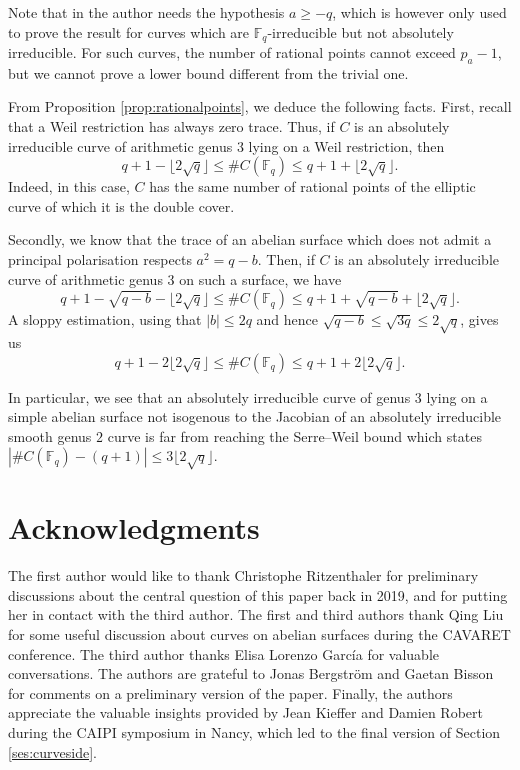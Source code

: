 \documentclass[11pt]{amsart}
\newcommand\Fq{\mathbb{F}_q}
\theoremstyle{plain}
\theoremstyle{definition}
\begin{document}
Note that in \cite[Thm.~4]{Haloui17} the author needs the hypothesis $a\geq -q$, which is however only used  to prove the result for curves which are $\Fq$-irreducible but not absolutely irreducible. For such curves, the number of rational points cannot exceed $p_a-1$, but we cannot prove a lower bound different from the trivial one.

From Proposition \ref{prop:rationalpoints}, we deduce the following facts. First, recall that a Weil restriction has always zero trace. Thus, if $C$ is an absolutely irreducible curve of arithmetic genus $3$ lying on a Weil restriction, then
\begin{equation}\label{eq:bound_weilrestr}
    q + 1 - \lfloor 2\sqrt{q}\rfloor\leq\#C(\Fq)\leq  q + 1 + \lfloor 2\sqrt{q}\rfloor.
\end{equation}
Indeed, in this case, $C$ has the same number of rational points of the elliptic curve of which it is the double cover.

Secondly, we know that the trace of an abelian surface which does not admit a principal polarisation respects $a^2=q-b$. Then, if $C$ is an absolutely irreducible curve of arithmetic genus $3$ on such a surface, we have
\[q + 1 -\sqrt{q-b}- \lfloor 2\sqrt{q}\rfloor\leq\#C(\Fq)\leq  q + 1 +\sqrt{q-b} +\lfloor 2\sqrt{q}\rfloor.\]
A sloppy estimation, using that $|b|\leq 2q$ and hence $\sqrt{q-b}\leq \sqrt{3q}\leq 2 \sqrt{q}$, gives us
\begin{equation}\label{eq:bound_nopp}
    q + 1 - 2\lfloor 2\sqrt{q}\rfloor\leq\#C(\Fq)\leq  q + 1 + 2\lfloor 2\sqrt{q}\rfloor.
\end{equation}

In particular, we see that an absolutely irreducible curve of genus $3$ lying on a simple abelian surface not isogenous to the Jacobian of an absolutely irreducible smooth genus $2$ curve is far from reaching the Serre--Weil bound which states $|\#C(\Fq)-  (q + 1)|\leq 3\lfloor 2\sqrt{q}\rfloor$.

\section*{Acknowledgments}
The first author would like to thank Christophe Ritzenthaler for preliminary discussions about the central question of this paper back in 2019, and for putting her in contact with the third author.  The first and third authors thank Qing Liu for some useful discussion about curves on abelian surfaces during the CAVARET conference. The third author thanks Elisa Lorenzo Garc\'ia for valuable conversations.
The authors are grateful to Jonas Bergstr\"om and Gaetan Bisson for comments on a preliminary version of the paper. Finally, the authors appreciate the valuable insights provided by Jean Kieffer and Damien Robert during the CAIPI symposium in Nancy, which led to the final version of Section \ref{ses:curveside}.
\end{document}
